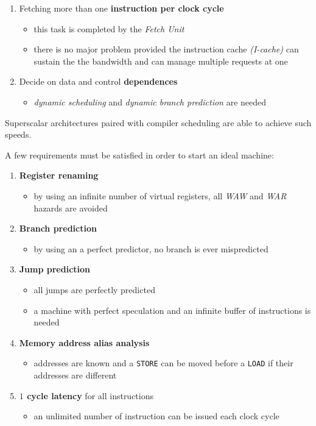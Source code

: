\documentclass[english]{article}
\begin{document}
\begin{enumerate}
  \item Fetching more than one \textbf{instruction per clock cycle}
        \begin{itemize}
          \item this task is completed by the \textit{Fetch Unit}
          \item there is no major problem provided the instruction cache \textit{(I-cache)} can sustain the the bandwidth and can manage multiple requests at one
        \end{itemize}
  \item Decide on data and control \textbf{dependences}
        \begin{itemize}
          \item \textit{dynamic scheduling} and \textit{dynamic branch prediction} are needed
        \end{itemize}
\end{enumerate}

Superscalar architectures paired with compiler scheduling are able to achieve such speeds.

\bigskip
A few requirements must be satisfied in order to start an ideal machine:

\begin{enumerate}
  \item \textbf{Register renaming}
        \begin{itemize}
          \item by using an infinite number of virtual registers, all \textit{WAW} and \textit{WAR} hazards are avoided
        \end{itemize}
  \item \textbf{Branch prediction}
        \begin{itemize}
          \item by using an a perfect predictor, no branch is ever mispredicted
        \end{itemize}
  \item \textbf{Jump prediction}
        \begin{itemize}
          \item all jumps are perfectly predicted
          \item a machine with perfect speculation and an infinite buffer of instructions is needed
        \end{itemize}
  \item \textbf{Memory address alias analysis}
        \begin{itemize}
          \item addresses are known and a \texttt{STORE} can be moved before a \texttt{LOAD} if their addresses are different
        \end{itemize}
  \item \textbf{\(1\) cycle latency} for all instructions
        \begin{itemize}
          \item an unlimited number of instruction can be issued each clock cycle
        \end{itemize}
\end{enumerate}
\end{document}

